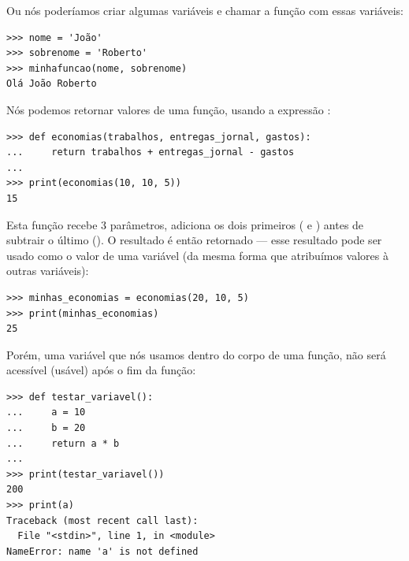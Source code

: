\noindent
Ou nós poderíamos criar algumas variáveis e chamar a função com essas variáveis:

\begin{listing}
\begin{verbatim}
>>> nome = 'João'
>>> sobrenome = 'Roberto'
>>> minhafuncao(nome, sobrenome)
Olá João Roberto
\end{verbatim}
\end{listing}

\noindent
Nós podemos retornar valores de uma função, usando a expressão :

\begin{listing}
\begin{verbatim}
>>> def economias(trabalhos, entregas_jornal, gastos):
...     return trabalhos + entregas_jornal - gastos
...
>>> print(economias(10, 10, 5))
15
\end{verbatim}
\end{listing}

Esta função recebe 3 parâmetros, adiciona os dois primeiros ( e ) antes de subtrair o último (). O resultado é então retornado --- esse resultado pode ser usado como o valor de uma variável (da mesma forma que atribuímos valores à outras variáveis):

\begin{listing}
\begin{verbatim}
>>> minhas_economias = economias(20, 10, 5)
>>> print(minhas_economias)
25
\end{verbatim}
\end{listing}

\noindent
Porém, uma variável que nós usamos dentro do corpo de uma função, não será acessível (usável) após o fim da função:

\begin{listing}
\begin{verbatim}
>>> def testar_variavel():
...     a = 10
...     b = 20
...     return a * b
...
>>> print(testar_variavel())
200
>>> print(a)
Traceback (most recent call last):
  File "<stdin>", line 1, in <module>
NameError: name 'a' is not defined
\end{verbatim}
\end{listing} 

